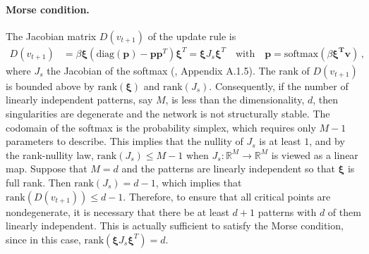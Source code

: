 \documentclass[12pt]{article}
\begin{document}
\paragraph{Morse condition.}
The Jacobian matrix $D(v_{t+1})$ of the update rule is
\begin{align*}
    D(v_{t+1}) &= \beta \bm{\xi}\left(\text{diag}(\bm{p})- \bm{p}\bm{p}^T \right)\bm{\xi}^T=\bm{\xi} J_s \bm{\xi}^T \hspace{1em} \text{with} \hspace{1em} \bm{p} = \text{softmax}(\beta\bm{\xi^T v}) \, ,
\end{align*}
where $J_s$ the Jacobian of the softmax (\cite{ramsauer2020hopfield}, Appendix A.1.5). The rank of $D(v_{t+1})$ is bounded above by $\text{rank}(\bm{\xi})$ and $\text{rank}(J_s)$. Consequently, if the number of linearly independent patterns, say $M$, is less than the dimensionality, $d$, then singularities are degenerate and the network is not structurally stable. The codomain of the softmax is the probability simplex, which requires only $M-1$ parameters to describe. This implies that the nullity of $J_s$ is at least $1$, and by the rank-nullity law, $\text{rank}(J_s)\leq M-1$ when $J_s: \mathbb{R}^M \rightarrow \mathbb{R}^M$ is viewed as a linear map. Suppose that $M=d$ and the patterns are linearly independent so that $\bm{\xi}$ is full rank. Then $\text{rank}(J_s) = d-1$, which implies that $\text{rank}(D(v_{t+1}))\leq d-1$. Therefore, to ensure that all critical points are nondegenerate, it is necessary that there be at least $d+1$ patterns with $d$ of them linearly independent. This is actually sufficient to satisfy the Morse condition, since in this case, $\text{rank}(\bm{\xi} J_s \bm{\xi}^T)=d$.
\end{document}
